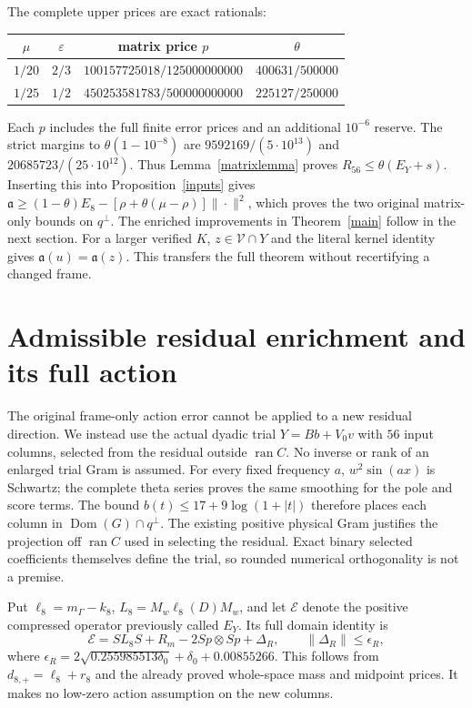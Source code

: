 \documentclass[12pt]{article}
\theoremstyle{remark}\newtheorem{remark}[theorem]{Remark}
\newcommand{\Ran}{\operatorname{ran}}
\newcommand{\Dom}{\operatorname{Dom}}
\begin{document}
The complete upper prices are exact rationals:
\begin{center}
\begin{tabular}{c|c|c|c}
$\mu$ & $\varepsilon$ & matrix price $p$ & $\theta$\\\hline
$1/20$ & $2/3$ & $100157725018/125000000000$ & $400631/500000$\\
$1/25$ & $1/2$ & $450253581783/500000000000$ & $225127/250000$
\end{tabular}
\end{center}
Each $p$ includes the full finite error prices and an additional
$10^{-6}$ reserve. The strict margins to $\theta(1-10^{-8})$ are
$9592169/(5\cdot10^{13})$ and $20685723/(25\cdot10^{12})$.
Thus Lemma~\ref{matrixlemma} proves $R_{56}\le\theta(E_Y+s)$.
Inserting this into Proposition~\ref{inputs} gives
$\mathfrak a\ge(1-\theta)E_8-[\rho+\theta(\mu-\rho)]\|\cdot\|^2$,
which proves the two original matrix-only bounds on $q^\perp$.
The enriched improvements in Theorem~\ref{main} follow in the next section.
For a larger verified $K$, $z\in\mathcal V\cap Y$ and the literal
kernel identity gives $\mathfrak a(u)=\mathfrak a(z)$.
This transfers the full theorem without recertifying a changed frame.

\section{Admissible residual enrichment and its full action}
The original frame-only action error cannot be applied to a new
residual direction. We instead use the actual dyadic trial
$Y=Bb+V_0v$ with $56$ input columns, selected from the residual outside
$\Ran C$. No inverse or rank of an enlarged trial Gram is assumed.
For every fixed frequency $a$, $w^2\sin(ax)$ is Schwartz; the complete
theta series proves the same smoothing for the pole and score terms.
The bound $b(t)\le17+9\log(1+|t|)$ therefore places each column in
$\Dom(G)\cap q^\perp$. The existing positive physical Gram justifies the
projection off $\Ran C$ used in selecting the residual. Exact binary
selected coefficients themselves define the trial, so rounded numerical
orthogonality is not a premise.

Put $\ell_8=m_\Gamma-k_8$, $L_8=M_w\ell_8(D)M_w$, and let
$\mathcal E$ denote the positive compressed operator previously called
$E_Y$. Its full domain identity is
\[
 \mathcal E=SL_8S+R_m-2Sp\otimes Sp+\Delta_R,
 \qquad \|\Delta_R\|\le\epsilon_R,
\]
where
$\epsilon_R=2\sqrt{0.255985513\delta_0}+\delta_0+0.00855266$.
This follows from $d_{8,+}=\ell_8+r_8$ and the already proved
whole-space mass and midpoint prices. It makes no low-zero action
assumption on the new columns.
\end{document}
